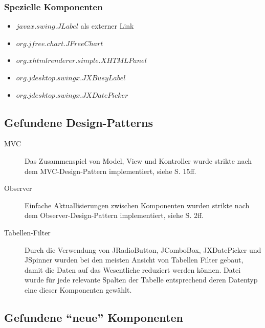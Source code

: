   \subsubsection{Spezielle Komponenten}
    
  \begin{itemize}
    \item \(javax.swing.JLabel\) als externer Link
    \item \(org.jfree.chart.JFreeChart\)
    \item \(org.xhtmlrenderer.simple.XHTMLPanel\)
    \item \(org.jdesktop.swingx.JXBusyLabel\)
    \item \(org.jdesktop.swingx.JXDatePicker\)
  \end{itemize}
    
  \subsection{Gefundene Design-Patterns}
  
  \begin{description}
    \item[MVC]
    Das Zusammenspiel von Model, View und Kontroller wurde strikte nach dem
    MVC-Design-Pattern implementiert, siehe \cite{GUIDesignPatterns} S. 15ff.
    \item[Observer]
    Einfache Aktuallisierungen zwischen Komponenten wurden strikte nach dem
    Observer-Design-Pattern implementiert, siehe \cite{GUIDesignPatterns} S.
    2ff.
    \item[Tabellen-Filter]
    Durch die Verwendung von JRadioButton, JComboBox, JXDatePicker und JSpinner
    wurden bei den meisten Ansicht von Tabellen Filter gebaut, damit die Daten
    auf das Wesentliche reduziert werden können. Datei wurde für jede relevante
    Spalten der Tabelle entsprechend deren Datentyp eine dieser Komponenten
    gewählt.
  \end{description}
  
  \subsection{Gefundene ``neue'' Komponenten}
  
